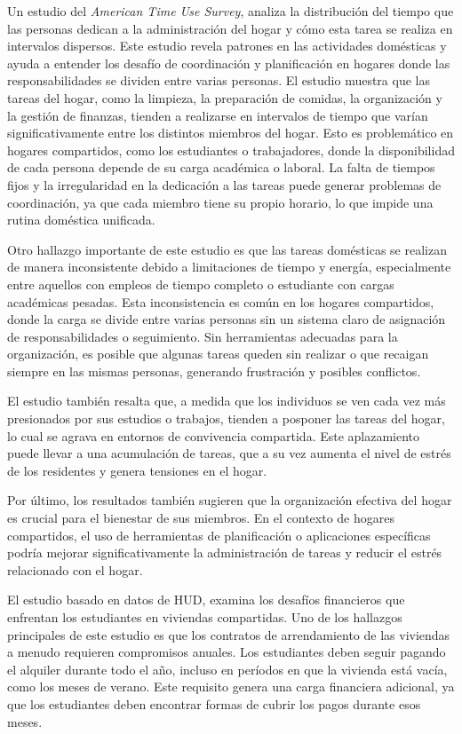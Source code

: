Un estudio del \textit{American Time Use Survey}, \cite{american2022} analiza la distribución del tiempo que las personas dedican a la administración del hogar
y cómo esta tarea se realiza en intervalos dispersos. Este estudio revela patrones en las actividades domésticas y ayuda a entender los 
desafío de coordinación y planificación en hogares donde las responsabilidades se dividen entre varias personas. El estudio muestra
que las tareas del hogar, como la limpieza, la preparación de comidas, la organización y la gestión de finanzas, tienden a realizarse en 
intervalos de tiempo que varían significativamente entre los distintos miembros del hogar. Esto es problemático en hogares compartidos, como 
los estudiantes o trabajadores, donde la disponibilidad de cada persona depende de su carga académica o laboral. La falta de tiempos fijos y 
la irregularidad en la dedicación a las tareas puede generar problemas de coordinación, ya que cada miembro tiene su propio horario, lo que impide
una rutina doméstica unificada.

Otro hallazgo importante de este estudio es que las tareas domésticas se realizan de manera inconsistente debido a limitaciones de tiempo y energía, especialmente
entre aquellos con empleos de tiempo completo o estudiante con cargas académicas pesadas. Esta inconsistencia es común en los hogares compartidos,
donde la carga se divide entre varias personas sin un sistema claro de asignación de responsabilidades o seguimiento. Sin herramientas adecuadas
para la organización, es posible que algunas tareas queden sin realizar o que recaigan siempre en las mismas personas, generando frustración y posibles 
conflictos.

El estudio también resalta que, a medida que los individuos se ven cada vez más presionados por sus estudios o trabajos, tienden a posponer las tareas del hogar, lo cual se 
agrava en entornos de convivencia compartida. Este aplazamiento puede llevar a una acumulación de tareas, que a su vez aumenta el nivel de estrés de los residentes y genera tensiones en el hogar.

Por último, los resultados también sugieren que la organización efectiva del hogar es crucial para el bienestar de sus miembros. En el contexto de hogares compartidos,
el uso de herramientas de planificación o aplicaciones específicas podría mejorar significativamente la administración de tareas y reducir el 
estrés relacionado con el hogar.


El estudio basado en datos de HUD, \cite{hud2022} examina los desafíos financieros que enfrentan los estudiantes en viviendas compartidas. Uno de los hallazgos
principales de este estudio es que los contratos de arrendamiento de las viviendas a menudo requieren compromisos anuales. Los estudiantes deben 
seguir pagando el alquiler durante todo el año, incluso en períodos en que la vivienda está vacía, como los meses de verano. Este requisito genera una carga
financiera adicional, ya que los estudiantes deben encontrar formas de cubrir los pagos durante esos meses.


